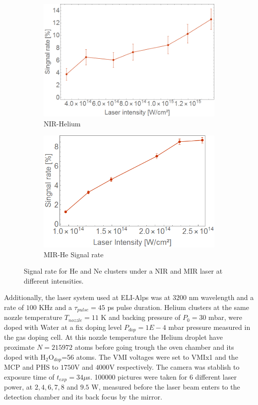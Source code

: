 \begin{figure}[h!]
\begin{subfigure}[l]{0.48\textwidth} \caption{NIR-Helium}
\includegraphics[width=1\textwidth]{../Images/results/NIR_He_intensityscan/signalrate.png} \end{subfigure}
\begin{subfigure}[l]{0.48\textwidth} \caption{MIR-He Signal rate} 
\includegraphics[width=1\textwidth]{../Images/results/MIR_He_waterIntensityscan/sigRate.png}\end{subfigure}
\caption[Intensity scan-signal rate]{Signal rate for He and Ne clusters under a NIR and MIR laser at different intensities.}
\label{fig:IntensitySigRate}
\end{figure}

Additionally, the laser system used at ELI-Alps was at $3200$ nm wavelength and a rate of $100$ KHz and a $\tau_{pulse}=45$ ps pulse duration. Helium clusters at the same nozzle temperature $T_{nozzle}=11$ K and  backing pressure of $P_{0}=30$ mbar, were doped with Water at a fix doping level $P_{dop}=1E-4$ mbar pressure measured in the gas doping cell. At this nozzle temperature the Helium droplet have proximate $N=215972$ atoms before going trough the oven chamber and its doped with H$_{2}$O$_{dop}$=56 atoms. The VMI voltages were set to VMIx1 and the MCP and PHS to $1750$V and $4000$V respectively. The camera was stablish to exposure time of $t_{exp}=34 \mu$s. 100000 pictures were taken for 6 different laser power, at $2, 4, 6, 7, 8$ and $9.5$ W, measured before the laser beam enters to the detection chamber and its back focus by the mirror. 

